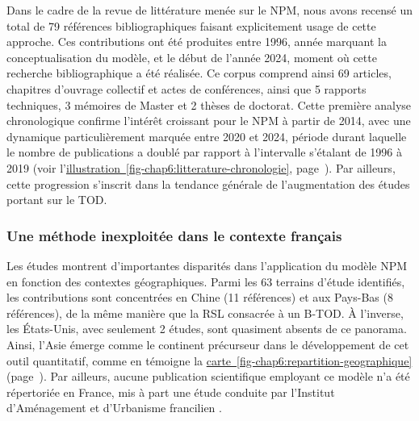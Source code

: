\begin{refsegment}
Dans le cadre de la revue de littérature menée sur le \acrshort{NPM}, nous avons recensé un total de 79 références bibliographiques faisant explicitement usage de cette approche. Ces contributions ont été produites entre 1996, année marquant la conceptualisation du modèle, et le début de l'année 2024, moment où cette recherche bibliographique a été réalisée. Ce corpus comprend ainsi 69 articles, chapitres d’ouvrage collectif et actes de conférences, ainsi que 5 rapports techniques, 3 mémoires de Master et 2 thèses de doctorat. Cette première analyse chronologique confirme l'intérêt croissant pour le \acrshort{NPM} à partir de 2014, avec une dynamique particulièrement marquée entre 2020 et 2024, période durant laquelle le nombre de publications a doublé par rapport à l’intervalle s'étalant de 1996 à 2019 (voir l'\hyperref[fig-chap6:litterature-chronologie]{illustration~\ref{fig-chap6:litterature-chronologie}}, page~\pageref{fig-chap6:litterature-chronologie}). Par ailleurs, cette progression s’inscrit dans la tendance générale de l'augmentation des études portant sur le \acrshort{TOD}.%

\subsubsection*{Une méthode inexploitée dans le contexte français
    \label{chap6:litterature-geographie}
    }

Les études montrent d’importantes disparités dans l'application du modèle \acrshort{NPM} en fonction des contextes géographiques. Parmi les 63 terrains d’étude identifiés, les contributions sont concentrées en Chine (11 références) et aux Pays-Bas (8 références), de la même manière que la \acrfull{RSL} consacrée à un \acrfull{B-TOD}. À l’inverse, les États-Unis, avec seulement 2 études, sont quasiment absents de ce panorama. Ainsi, l’Asie émerge comme le continent précurseur dans le développement de cet outil quantitatif, comme en témoigne la \hyperref[fig-chap6:repartition-geographique]{carte~\ref{fig-chap6:repartition-geographique}} (page~\pageref{fig-chap6:repartition-geographique}). Par ailleurs, aucune publication scientifique employant ce modèle n'a été répertoriée en France, mis à part une étude conduite par l'Institut d'Aménagement et d'Urbanisme francilien \textcolor{blue}{\autocite[2]{iau_articulation_2017}}.%


\end{refsegment}
